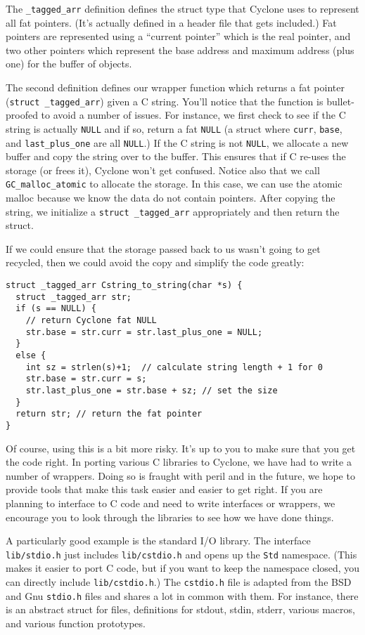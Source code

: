 The \texttt{\_tagged\_arr} definition defines the struct type that
Cyclone uses to represent all fat pointers.  (It's actually defined
in a header file that gets included.)  Fat pointers are represented
using a ``current pointer'' which is the real pointer, and two
other pointers which represent the base address and maximum address
(plus one) for the buffer of objects.  

The second definition defines our wrapper function which returns a fat
pointer (\texttt{struct \_tagged\_arr}) given a C string.  You'll
notice that the function is bullet-proofed to avoid a number of
issues.  For instance, we first check to see if the C string is
actually \texttt{NULL} and if so, return a fat \texttt{NULL} 
(a struct where \texttt{curr}, \texttt{base}, and \texttt{last\_plus\_one}
are all \texttt{NULL}.)  If the C string is not \texttt{NULL},
we allocate a new buffer and copy the string over to the buffer.
This ensures that if C re-uses the storage (or frees it), Cyclone
won't get confused.  Notice also that we call \texttt{GC\_malloc\_atomic}
to allocate the storage.  In this case, we can use the atomic
malloc because we know the data do not contain pointers.
After copying the string, we initialize a \texttt{struct \_tagged\_arr}
appropriately and then return the struct.  

If we could ensure that the storage passed back to us wasn't
going to get recycled, then we could avoid the copy and simplify
the code greatly:
\begin{verbatim}
struct _tagged_arr Cstring_to_string(char *s) {
  struct _tagged_arr str;
  if (s == NULL) {
    // return Cyclone fat NULL
    str.base = str.curr = str.last_plus_one = NULL;
  }
  else {
    int sz = strlen(s)+1;  // calculate string length + 1 for 0
    str.base = str.curr = s; 
    str.last_plus_one = str.base + sz; // set the size
  }
  return str; // return the fat pointer
}
\end{verbatim}

Of course, using this is a bit more risky.  It's up to you
to make sure that you get the code right.
In porting various C libraries to Cyclone, we have had to write
a number of wrappers.  Doing so is fraught with peril and in the
future, we hope to provide tools that make this task easier
and easier to get right.  If you are planning to interface to
C code and need to write interfaces or wrappers, we encourage
you to look through the libraries to see how we have done
things.  

A particularly good example is the standard I/O library.  The
interface \texttt{lib/stdio.h} just includes \texttt{lib/cstdio.h}
and opens up the \texttt{Std} namespace.  (This makes it easier
to port C code, but if you want to keep the namespace closed,
you can directly include \texttt{lib/cstdio.h}.)  The \texttt{cstdio.h}
file is adapted from the BSD and Gnu \texttt{stdio.h} files
and shares a lot in common with them.  For instance, there
is an abstract struct for files, definitions for stdout, stdin,
stderr, various macros, and various function prototypes.

